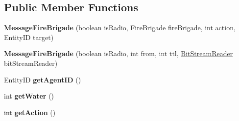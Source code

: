 \subsection*{Public Member Functions}
\begin{DoxyCompactItemize}
\item 
\hypertarget{classadf_1_1agent_1_1communication_1_1standard_1_1bundle_1_1information_1_1MessageFireBrigade_a8ca53c7d1ab972720c03f53ee6eb018c}{}\label{classadf_1_1agent_1_1communication_1_1standard_1_1bundle_1_1information_1_1MessageFireBrigade_a8ca53c7d1ab972720c03f53ee6eb018c} 
{\bfseries Message\+Fire\+Brigade} (boolean is\+Radio, Fire\+Brigade fire\+Brigade, int action, Entity\+ID target)
\item 
\hypertarget{classadf_1_1agent_1_1communication_1_1standard_1_1bundle_1_1information_1_1MessageFireBrigade_ad32bcb9148c11b56deb5d815d70dab17}{}\label{classadf_1_1agent_1_1communication_1_1standard_1_1bundle_1_1information_1_1MessageFireBrigade_ad32bcb9148c11b56deb5d815d70dab17} 
{\bfseries Message\+Fire\+Brigade} (boolean is\+Radio, int from, int ttl, \hyperlink{classadf_1_1component_1_1communication_1_1util_1_1BitStreamReader}{Bit\+Stream\+Reader} bit\+Stream\+Reader)
\item 
\hypertarget{classadf_1_1agent_1_1communication_1_1standard_1_1bundle_1_1information_1_1MessageFireBrigade_adcaaf7589307c3a98c1ae64031cd0902}{}\label{classadf_1_1agent_1_1communication_1_1standard_1_1bundle_1_1information_1_1MessageFireBrigade_adcaaf7589307c3a98c1ae64031cd0902} 
Entity\+ID {\bfseries get\+Agent\+ID} ()
\item 
\hypertarget{classadf_1_1agent_1_1communication_1_1standard_1_1bundle_1_1information_1_1MessageFireBrigade_a417145b23aff282bb388376443e8347c}{}\label{classadf_1_1agent_1_1communication_1_1standard_1_1bundle_1_1information_1_1MessageFireBrigade_a417145b23aff282bb388376443e8347c} 
int {\bfseries get\+Water} ()
\item 
\hypertarget{classadf_1_1agent_1_1communication_1_1standard_1_1bundle_1_1information_1_1MessageFireBrigade_a5c6625085dcecd0c9e1f9664eff5fd28}{}\label{classadf_1_1agent_1_1communication_1_1standard_1_1bundle_1_1information_1_1MessageFireBrigade_a5c6625085dcecd0c9e1f9664eff5fd28} 
int {\bfseries get\+Action} ()
\item 
\hypertarget{classadf_1_1agent_1_1communication_1_1standard_1_1bundle_1_1information_1_1MessageFireBrigade_ae9d02ce7cb38cb6fc345002a49e222f1}{}\label{classadf_1_1agent_1_1communication_1_1standard_1_1bundle_1_1information_1_1MessageFireBrigade_ae9d02ce7cb38cb6fc345002a49e222f1} 

\end{DoxyCompactItemize}
